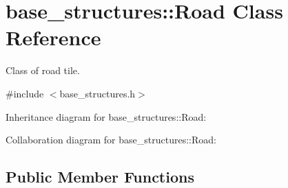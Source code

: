 \hypertarget{classbase__structures_1_1Road}{}\section{base\+\_\+structures\+:\+:Road Class Reference}
\label{classbase__structures_1_1Road}


Class of road tile.  




{\ttfamily \#include $<$base\+\_\+structures.\+h$>$}



Inheritance diagram for base\+\_\+structures\+:\+:Road\+:


Collaboration diagram for base\+\_\+structures\+:\+:Road\+:
\subsection*{Public Member Functions}
